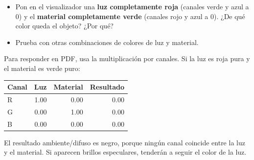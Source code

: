 \documentclass[
  spanish,
  11pt,
  a4paper,
  DIV=11,
  numbers=noendperiod]{scrartcl}
\begin{document}
\begin{tcolorbox}[enhanced jigsaw, colframe=quarto-callout-note-color-frame, arc=.35mm, bottomrule=.15mm, left=2mm, breakable, opacityback=0, coltitle=black, bottomtitle=1mm, toptitle=1mm, titlerule=0mm, toprule=.15mm, rightrule=.15mm, title={Experimenta con colores}, colbacktitle=quarto-callout-note-color!10!white, opacitybacktitle=0.6, colback=white, leftrule=.75mm]

\begin{itemize}
\item
  Pon en el visualizador una \textbf{luz completamente roja} (canales verde y azul a 0) y el \textbf{material completamente verde} (canales rojo y azul a 0). ¿De qué color queda el objeto? ¿Por qué?
\item
  Prueba con otras combinaciones de colores de luz y material.
\end{itemize}

\end{tcolorbox}

Para responder en PDF, usa la multiplicación por canales. Si la luz es roja pura y el material es verde puro:

\begin{longtable}[]{@{}lrrr@{}}
\toprule\noalign{}
Canal & Luz & Material & Resultado \\
\midrule\noalign{}
\endhead
\bottomrule\noalign{}
\endlastfoot
R & 1.00 & 0.00 & 0.00 \\
G & 0.00 & 1.00 & 0.00 \\
B & 0.00 & 0.00 & 0.00 \\
\end{longtable}

El resultado ambiente/difuso es negro, porque ningún canal coincide entre la luz y el material. Si aparecen brillos especulares, tenderán a seguir el color de la luz.
\end{document}
